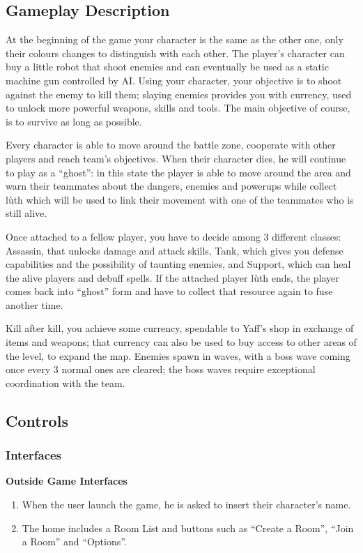 \documentclass[12pt]{article}
\begin{document}
\subsection{Gameplay Description}

At the beginning of the game your character is the same as the other one, only their colours changes to distinguish with each other. The player’s character can buy a little robot that shoot enemies and can eventually be used as a static machine gun controlled by AI. Using your character, your objective is to shoot against the enemy to kill them; slaying enemies provides you with currency, used to unlock more powerful weapons, skills and tools. The main objective of course, is to survive as long as possible.

Every character is able to move around the battle zone, cooperate with other players and reach team’s objectives. When their character dies, he will continue to play as a “ghost”: in this state the player is able to move around the area and warn their teammates about the dangers, enemies and powerups while collect lùth which will be used to link their movement with one of the teammates who is still alive.

Once attached to a fellow player, you have to decide among 3 different classes: Assassin, that unlocks damage and attack skills, Tank, which gives you defense capabilities and the possibility of taunting enemies, and Support, which can heal the alive players and debuff spells. If the attached player lùth ends, the player comes back into “ghost” form and have to collect that resource again to fuse another time.

Kill after kill, you achieve some currency, spendable to Yaff’s shop in exchange of items and weapons; that currency can also be used to buy access to other areas of the level, to expand the map. Enemies spawn in waves, with a boss wave coming once every 3 normal ones are cleared; the boss waves require exceptional coordination with the team.

\subsection{Controls}

\subsubsection{Interfaces}

\textbf{Outside Game Interfaces}
\begin{enumerate}
	\item When the user launch the game, he is asked to insert their character’s name.
	\item The home includes a Room List and buttons such as “Create a Room”, “Join a Room” and “Options”.
\end{enumerate}
\end{document}
